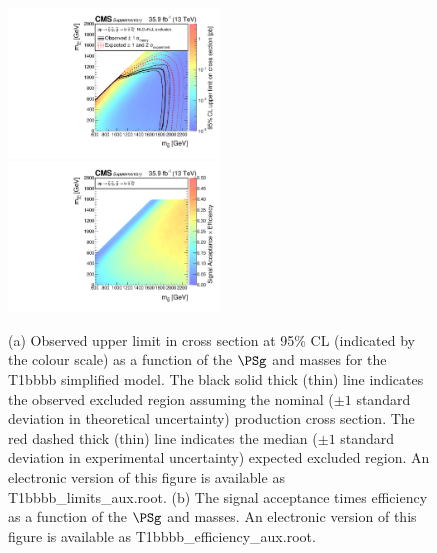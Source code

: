 \begin{figure}
    \begin{center}
            \includegraphics[width=0.50\textwidth]{Supplementary/CMS-SUS-16-038_Figure-aux_016-a}
            \includegraphics[width=0.50\textwidth]{Supplementary/CMS-SUS-16-038_Figure-aux_016-b}
        \caption{ (a) Observed upper limit in cross section at 95\% CL (indicated
        by the colour scale) as a function of 
        the $\PSg$ and \PSGczDo %
        masses for the 
        T1bbbb %
        simplified  model.  The  black  solid thick  (thin)  line indicates  the
        observed  excluded  region  assuming   the  nominal  (${\pm}1$  standard
        deviation in theoretical uncertainty)  production cross section. The red
        dashed  thick  (thin)  line  indicates  the  median  (${\pm}1$  standard
        deviation in experimental uncertainty) expected excluded region.
    An electronic version of this figure is available as T1bbbb\_limits\_aux.root.
        (b) The signal acceptance times efficiency as a function of 
        the $\PSg$ and \PSGczDo %
        masses.
    An electronic version of this figure is available as T1bbbb\_efficiency\_aux.root.
        }
        \label{fig:T1bbbb}
    \end{center}
\end{figure}

